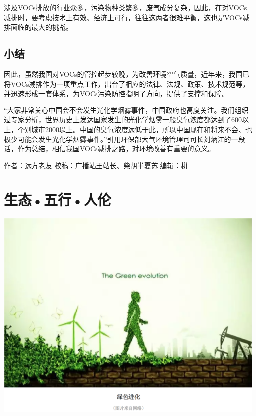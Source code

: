 \documentclass[]{book}
\begin{document}
涉及VOCs排放的行业众多，污染物种类繁多，废气成分复杂，因此，在对VOCs减排时，要考虑技术上有效、经济上可行，往往这两者很难平衡，这也是VOCs减排面临的最大的挑战。

\subsection{小结}\label{-1}

因此，虽然我国对VOCs的管控起步较晚，为改善环境空气质量，近年来，我国已将VOCs减排作为一项重点工作，出台了相应的法律、法规、政策、技术规范等，并迅速形成一套体系，为VOCs污染防控指明了方向，提供了支撑和保障。

``大家非常关心中国会不会发生光化学烟雾事件，中国政府也高度关注。我们组织过专家分析，世界历史上发达国家发生的光化学烟雾一般臭氧浓度都达到了600以上，个别城市2000以上。中国的臭氧浓度远低于此，所以中国现在和将来不会、也极少可能会发生光化学烟雾事件。''引用环保部大气环境管理司司长刘炳江的一段话，作为总结，相信我国VOCs减排之路，对环境改善有重要的意义。

作者：远方老友 校稿：广播站王站长、柴胡半夏苏 编辑：栟

\section{生态•五行•人伦}

\includegraphics[width=8.33in]{images/swr1}
\end{document}
